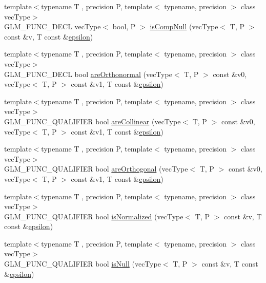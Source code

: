 \begin{DoxyCompactItemize}
\item 
{\footnotesize template$<$typename T , precision P, template$<$ typename, precision $>$ class vec\-Type$>$ }\\G\-L\-M\-\_\-\-F\-U\-N\-C\-\_\-\-D\-E\-C\-L vec\-Type$<$ bool, P $>$ \hyperlink{group__gtx__vector__query_ga93ecd4137480483ce1af0de8bbbf6546}{is\-Comp\-Null} (vec\-Type$<$ T, P $>$ const \&v, T const \&\hyperlink{group__gtc__constants_gacb41049b8d22c8aa90e362b96c524feb}{epsilon})
\item 
{\footnotesize template$<$typename T , precision P, template$<$ typename, precision $>$ class vec\-Type$>$ }\\G\-L\-M\-\_\-\-F\-U\-N\-C\-\_\-\-D\-E\-C\-L bool \hyperlink{group__gtx__vector__query_ga89c82bc60e5b84e4489b74c15a134caf}{are\-Orthonormal} (vec\-Type$<$ T, P $>$ const \&v0, vec\-Type$<$ T, P $>$ const \&v1, T const \&\hyperlink{group__gtc__constants_gacb41049b8d22c8aa90e362b96c524feb}{epsilon})
\item 
{\footnotesize template$<$typename T , precision P, template$<$ typename, precision $>$ class vec\-Type$>$ }\\G\-L\-M\-\_\-\-F\-U\-N\-C\-\_\-\-Q\-U\-A\-L\-I\-F\-I\-E\-R bool \hyperlink{group__gtx__vector__query_ga465b844190d1740051e45d780832ea4c}{are\-Collinear} (vec\-Type$<$ T, P $>$ const \&v0, vec\-Type$<$ T, P $>$ const \&v1, T const \&\hyperlink{group__gtc__constants_gacb41049b8d22c8aa90e362b96c524feb}{epsilon})
\item 
{\footnotesize template$<$typename T , precision P, template$<$ typename, precision $>$ class vec\-Type$>$ }\\G\-L\-M\-\_\-\-F\-U\-N\-C\-\_\-\-Q\-U\-A\-L\-I\-F\-I\-E\-R bool \hyperlink{group__gtx__vector__query_gaee10acefed397c11e01f2862e837754c}{are\-Orthogonal} (vec\-Type$<$ T, P $>$ const \&v0, vec\-Type$<$ T, P $>$ const \&v1, T const \&\hyperlink{group__gtc__constants_gacb41049b8d22c8aa90e362b96c524feb}{epsilon})
\item 
{\footnotesize template$<$typename T , precision P, template$<$ typename, precision $>$ class vec\-Type$>$ }\\G\-L\-M\-\_\-\-F\-U\-N\-C\-\_\-\-Q\-U\-A\-L\-I\-F\-I\-E\-R bool \hyperlink{group__gtx__vector__query_ga6fa5fa2af67d14c205d24c49aad03270}{is\-Normalized} (vec\-Type$<$ T, P $>$ const \&v, T const \&\hyperlink{group__gtc__constants_gacb41049b8d22c8aa90e362b96c524feb}{epsilon})
\item 
{\footnotesize template$<$typename T , precision P, template$<$ typename, precision $>$ class vec\-Type$>$ }\\G\-L\-M\-\_\-\-F\-U\-N\-C\-\_\-\-Q\-U\-A\-L\-I\-F\-I\-E\-R bool \hyperlink{group__gtx__vector__query_ga81a64edc1a2b470b82896592e89c523b}{is\-Null} (vec\-Type$<$ T, P $>$ const \&v, T const \&\hyperlink{group__gtc__constants_gacb41049b8d22c8aa90e362b96c524feb}{epsilon})

\end{DoxyCompactItemize}
